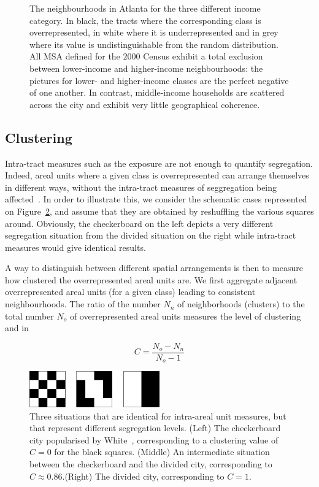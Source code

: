 \begin{figure}[!h]
    \caption{The neighbourhoods in Atlanta for the three different
      income category. In black, the tracts where the corresponding
      class is overrepresented, in white where it is
      underrepresented and in grey where its value is
      undistinguishable from the random distribution. All
      MSA defined for the $2000$ Census exhibit a total exclusion between
      lower-income and higher-income
      neighbourhoods: the pictures for lower- and higher-income classes are the
      perfect negative of one another. In contrast, middle-income households
      are scattered across the city and exhibit very little geographical coherence.}
\label{fig:atlanta_neighbourhoods}
\end{figure}



\subsection{Clustering}
\label{sub:clustering}

Intra-tract measures such as the exposure are not enough to quantify
segregation. Indeed, areal units where a given class is overrepresented can
arrange themselves in different ways, without the intra-tract measures of
seggregation being affected~\cite{White:1983}. In order to illustrate this, we
consider the schematic cases represented on Figure~\ref{fig:checkerboard}, and
assume that  they are obtained by reshuffling the various squares around.
Obviously, the checkerboard on the left depicts a very different segregation
situation from the divided situation on the right while intra-tract measures
would give identical results.


A way to distinguish between different spatial arrangements is then to measure
how clustered the overrepresented areal units are. We first aggregate adjacent
overrepresented areal units (for a given class) leading to consistent
neighbourhoods. The ratio of the number $N_n$ of neighborhoods (clusters) to the
total number $N_o$ of overrepresented areal units measures the level of
clustering and in 

\begin{equation} 
    C = \frac{N_{o}-N_{n}}{N_{o}-1} 
\end{equation}

\begin{figure}[!h]
    \centering
    \includegraphics[width=0.5\textwidth]{./gfx/chapter-segregation/figure5.pdf}
    \caption{Three situations that are identical for intra-areal unit measures,
        but that represent different segregation levels. (Left) The checkerboard
        city popularised by White~\cite{White:1983}, corresponding to a
        clustering value of $C=0$ for the black squares. (Middle) An
        intermediate situation between the checkerboard and the divided city,
        corresponding to $C \approx 0.86$.(Right) The divided city, corresponding to
        $C=1$. \label{fig:checkerboard}} 
\end{figure}

